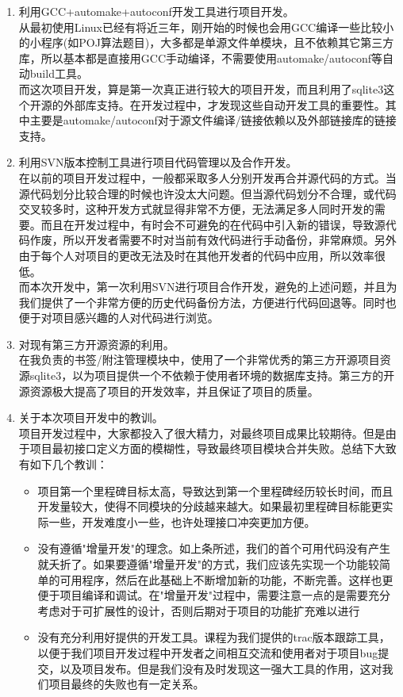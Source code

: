 \documentclass[a4paper,12pt]{article}
\begin{document}
\begin{CJK*}{UTF8}{song}
	\begin{enumerate}
		\item{利用GCC+automake+autoconf开发工具进行项目开发。\\
			从最初使用Linux已经有将近三年，刚开始的时候也会用GCC编译一些比较小的小程序(如POJ算法题目)，大多都是单源文件单模块，且不依赖其它第三方库，所以基本都是直接用GCC手动编译，不需要使用automake/autoconf等自动build工具。\\
			而这次项目开发，算是第一次真正进行较大的项目开发，而且利用了sqlite3这个开源的外部库支持。在开发过程中，才发现这些自动开发工具的重要性。其中主要是automake/autoconf对于源文件编译/链接依赖以及外部链接库的链接支持。}
		\item{利用SVN版本控制工具进行项目代码管理以及合作开发。\\
			在以前的项目开发过程中，一般都采取多人分别开发再合并源代码的方式。当源代码划分比较合理的时候也许没太大问题。但当源代码划分不合理，或代码交叉较多时，这种开发方式就显得非常不方便，无法满足多人同时开发的需要。而且在开发过程中，有时会不可避免的在代码中引入新的错误，导致源代码作废，所以开发者需要不时对当前有效代码进行手动备份，非常麻烦。另外由于每个人对项目的更改无法及时在其他开发者的代码中应用，所以效率很低。\\
			而本次开发中，第一次利用SVN进行项目合作开发，避免的上述问题，并且为我们提供了一个非常方便的历史代码备份方法，方便进行代码回退等。同时也便于对项目感兴趣的人对代码进行浏览。}
		\item{对现有第三方开源资源的利用。\\
			在我负责的书签/附注管理模块中，使用了一个非常优秀的第三方开源项目资源sqlite3，以为项目提供一个不依赖于使用者环境的数据库支持。第三方的开源资源极大提高了项目的开发效率，并且保证了项目的质量。}
		\item{关于本次项目开发中的教训。\\
			项目开发过程中，大家都投入了很大精力，对最终项目成果比较期待。但是由于项目最初接口定义方面的模糊性，导致最终项目模块合并失败。总结下大致有如下几个教训：
			\begin{itemize}
				\item{项目第一个里程碑目标太高，导致达到第一个里程碑经历较长时间，而且开发量较大，使得不同模块的分歧越来越大。如果最初里程碑目标能更实际一些，开发难度小一些，也许处理接口冲突更加方便。}
				\item{没有遵循"增量开发"的理念。如上条所述，我们的首个可用代码没有产生就夭折了。如果要遵循"增量开发"的方式，我们应该先实现一个功能较简单的可用程序，然后在此基础上不断增加新的功能，不断完善。这样也更便于项目编译和调试。在"增量开发"过程中，需要注意一点的是需要充分考虑对于可扩展性的设计，否则后期对于项目的功能扩充难以进行}
				\item{没有充分利用好提供的开发工具。课程为我们提供的trac版本跟踪工具，以便于我们项目开发过程中开发者之间相互交流和使用者对于项目bug提交，以及项目发布。但是我们没有及时发现这一强大工具的作用，这对我们项目最终的失败也有一定关系。}
			\end{itemize}
			}
	\end{enumerate}

\end{CJK*}
\end{document}
